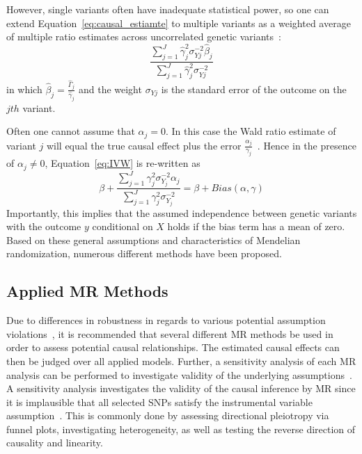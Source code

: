 However, single variants often have inadequate statistical power, so one can extend Equation~\ref{eq:causal_estiamte} to multiple variants as a weighted average of multiple ratio estimates across uncorrelated genetic variants~\cite{Bowden2015}:
\begin{equation} \label{eq:IVW}
  \frac{\sum^J_{j=1} \hat{\gamma}_j^2\sigma_{Yj}^{-2} \hat{\beta}_j}
  {\sum^J_{j=1} \hat{\gamma}_j^2\sigma_{Yj}^{-2}}
\end{equation}
in which $\hat{\beta}_j = \frac{\hat{\Gamma}_j}{\hat{\gamma}_j}$ and the weight $\sigma_{Yj}$ is the standard error of the outcome on the $jth$ variant.

Often one cannot assume that $\alpha_j = 0$.
In this case the Wald ratio estimate of variant $j$ will equal the true causal effect plus the error $\frac{\alpha_j}{\gamma_j}$~\cite{Bowden2015}. 
Hence in the presence of $\alpha_j \neq 0$, Equation~\ref{eq:IVW} is re-written as
\begin{equation} \label{eq:TSLSbias}
  \beta + \frac{\sum^J_{j=1} \gamma_j^2\sigma_{Y_j}^{-2} \alpha_j}
  {\sum^J_{j=1} \gamma_j^2\sigma_{Y_j}^{-2}} = \beta + Bias(\alpha, \gamma)
\end{equation}
Importantly, this implies that the assumed independence between genetic variants with the outcome $y$ conditional on $X$ holds if the bias term has a mean of zero.
Based on these general assumptions and characteristics of Mendelian randomization, numerous different methods have been proposed.

\subsection{Applied MR Methods}
\label{sub:Used_Methods}

Due to differences in robustness in regards to various potential assumption violations~\citet{Burgess2016}, it is recommended that several different MR methods be used in order to assess potential causal relationships.
The estimated causal effects can then be judged over all  applied models.
Further, a sensitivity analysis of each MR analysis can be performed to investigate validity of the underlying assumptions~\cite{Burgess2016}.
A sensitivity analysis investigates the validity of the causal inference by MR since it is implausible that all selected SNPs satisfy the instrumental variable assumption~\cite{Burgess2016}.
This is commonly done by assessing directional pleiotropy via funnel plots, investigating heterogeneity, as well as testing the reverse direction of causality and linearity.

